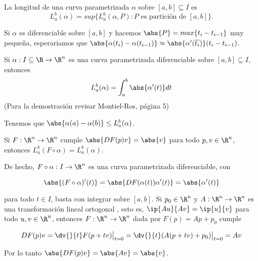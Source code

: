 \documentclass{article}
\begin{document}
\begin{dfn}
    La longitud de una curva parametrizada $\alpha$ sobre $[a,b]\subseteq I$ es
    \begin{equation*}
        L_{a}^{b}(\alpha)=sup\{L_{a}^{b}(\alpha,P):P\text{ es partición de }[a,b]\}.
    \end{equation*}
\end{dfn}

\noindent Si $\alpha$ es diferenciable sobre $[a,b]$ y hacemos $\abs{P}=max\{t_{i}-t_{i-1}\}$ muy
pequeña, esperariamos que $\abs{\alpha(t_{i})-\alpha(t_{i-1})}\approx
\abs{\alpha'(\overline{t_{i}})}(t_{i}-t_{i-1})$.

\begin{prop}
    Si $\alpha:I\subseteq\R\to\R^{n}$ es una curva parametrizada diferenciable sobre $[a,b]
    \subseteq I$, entonces 
    \begin{equation*}
        L_{a}^{b}(\alpha)=\int_{a}^{b}\abs{\alpha'(t)}dt
    \end{equation*}
    (Para la demostración revisar Montiel-Ros, página 5)
\end{prop}

\begin{cor}
    Tenemos que $\abs{\alpha(a)-\alpha(b)}\leq L_{a}^{b}(\alpha)$.
\end{cor}

\begin{cor}
    Si $F:\R^{n}\to\R^{n}$ cumple $\abs{DF(p)v}=\abs{v}$ para todo $p,v\in\R^{n}$, entonces
    $L_{a}^{b}(F\circ\alpha)=L_{a}^{b}(\alpha)$.
\end{cor}

\noindent De hecho, $F\circ\alpha: I\to\R^{n}$ es una curva parametrizada diferenciable, con

\begin{equation*}
    \abs{(F\circ\alpha)'(t)}=\abs{DF(\alpha(t))\alpha'(t)}=\abs{\alpha'(t)}
\end{equation*}

\noindent para todo $t\in I$, basta con integrar sobre $[a,b]$. Si $p_{0}\in\R^{n}$ y 
$A:\R^{n}\to\R^{n}$ es una transformación lineal ortogonal , esto es, $\ip{Au}{Av}=\ip{u}{v}$ 
para todo $u,v\in\R^{n}$, entonces $F:\R^{n}\to\R^{n}$ dada por $F(p)=Ap+p_{0}$ cumple

\begin{equation*}
    DF(p)v=\dv{}{t}F(p+tv)\big|_{t=0}=\dv{}{t}(A(p+tv)+p_{0})\big|_{t=0}=Av
\end{equation*}

\noindent Por lo tanto $\abs{DF(p)v}=\abs{Av}=\abs{v}$.
\end{document}
